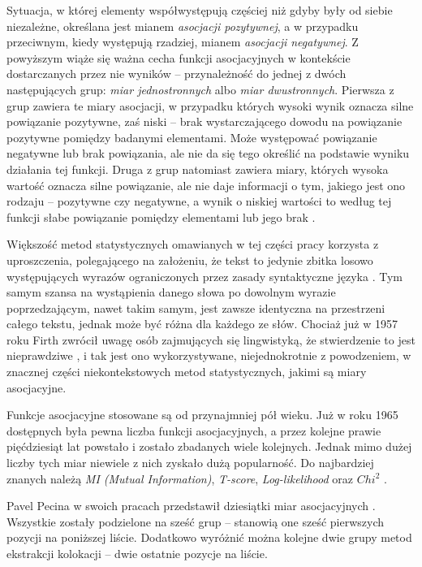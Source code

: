 \par
Sytuacja, w której elementy współwystępują częściej niż gdyby były od siebie niezależne, określana jest mianem \emph{asocjacji pozytywnej}, a w przypadku przeciwnym, kiedy występują rzadziej, mianem \emph{asocjacji negatywnej}.
Z powyższym wiąże się ważna cecha funkcji asocjacyjnych w kontekście dostarczanych przez nie wyników -- przynależność do jednej z dwóch następujących grup: \emph{miar jednostronnych} albo \emph{miar dwustronnych}.
Pierwsza z grup zawiera te miary asocjacji, w przypadku których wysoki wynik oznacza silne powiązanie pozytywne, zaś niski -- brak wystarczającego dowodu na powiązanie pozytywne pomiędzy badanymi elementami.
Może występować powiązanie negatywne lub brak powiązania, ale nie da się tego określić na podstawie wyniku działania tej funkcji.
Druga z grup natomiast zawiera miary, których wysoka wartość oznacza silne powiązanie, ale nie daje informacji o tym, jakiego jest ono rodzaju -- pozytywne czy negatywne, a wynik o niskiej wartości to według tej funkcji słabe powiązanie pomiędzy elementami lub jego brak
\cite[str. 20, 21, 75, 76]{evert}.

\par
Większość metod statystycznych omawianych w tej części pracy korzysta z uproszczenia, polegającego na założeniu, że tekst to jedynie zbitka losowo występujących wyrazów ograniczonych przez zasady syntaktyczne języka \cite[str. 6]{pecina_measures}.
Tym samym szansa na wystąpienia danego słowa po dowolnym wyrazie poprzedzającym, nawet takim samym, jest zawsze identyczna na przestrzeni całego tekstu, jednak może być różna dla każdego ze słów.
Chociaż już w 1957 roku Firth zwrócił uwagę osób zajmujących się lingwistyką, że stwierdzenie to jest nieprawdziwe \cite[str. 15]{evert}, i tak jest ono wykorzystywane, niejednokrotnie z powodzeniem, w znacznej części niekontekstowych metod statystycznych, jakimi są miary asocjacyjne.

\par
Funkcje asocjacyjne stosowane są od przynajmniej pół wieku.
Już w roku 1965 dostępnych była pewna liczba funkcji asocjacyjnych, a przez kolejne prawie pięćdziesiąt lat powstało i zostało zbadanych wiele kolejnych. 
Jednak mimo dużej liczby tych miar niewiele z nich zyskało dużą popularność.
Do najbardziej znanych należą \emph{MI (Mutual Information)}, \emph{T-score}, \emph{Log-likelihood} oraz $ Chi^2 $ \cite[str. 21]{evert}.

\par
Pavel Pecina w swoich pracach przedstawił dziesiątki miar asocjacyjnych \cite[str. 3]{coling}\cite[str. 18]{pecina_measures}.
Wszystkie zostały podzielone na sześć grup \cite[str. 2]{coling} -- stanowią one sześć pierwszych pozycji na poniższej liście.
Dodatkowo wyróżnić można kolejne dwie grupy metod ekstrakcji kolokacji -- dwie ostatnie pozycje na liście.

